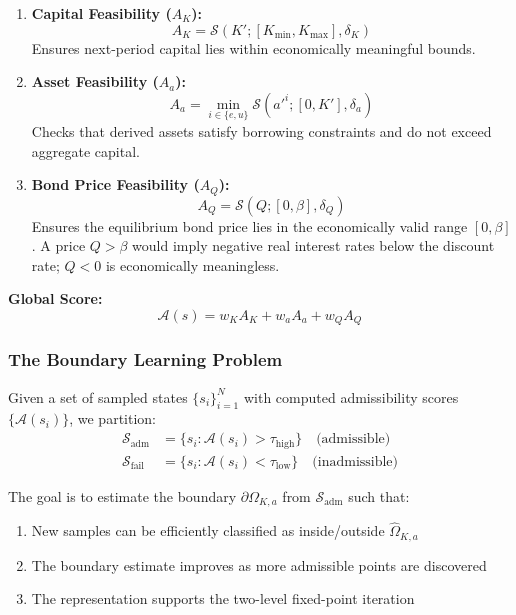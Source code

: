 \begin{enumerate}
    \item \textbf{Capital Feasibility ($A_K$):}
    \begin{equation}
        A_K = \mathcal{S}(K'; [K_{\min}, K_{\max}], \delta_K)
    \end{equation}
    Ensures next-period capital lies within economically meaningful bounds.
    
    \item \textbf{Asset Feasibility ($A_a$):}
    \begin{equation}
        A_a = \min_{i \in \{e, u\}} \mathcal{S}(a'^i; [0, K'], \delta_a)
    \end{equation}
    Checks that derived assets satisfy borrowing constraints and do not exceed aggregate capital.
    
    \item \textbf{Bond Price Feasibility ($A_Q$):}
    \begin{equation}
        A_Q = \mathcal{S}(Q; [0, \beta], \delta_Q)
    \end{equation}
    Ensures the equilibrium bond price lies in the economically valid range $[0, \beta]$. A price $Q > \beta$ would imply negative real interest rates below the discount rate; $Q < 0$ is economically meaningless.
\end{enumerate}

\textbf{Global Score:}
\begin{equation}
    \mathcal{A}(s) = w_K A_K + w_a A_a + w_Q A_Q
\end{equation}

\subsubsection{The Boundary Learning Problem}

Given a set of sampled states $\{s_i\}_{i=1}^N$ with computed admissibility scores $\{\mathcal{A}(s_i)\}$, we partition:
\begin{align}
    \mathcal{S}_{\text{adm}} &= \{s_i : \mathcal{A}(s_i) > \tau_{\text{high}}\} \quad \text{(admissible)} \\
    \mathcal{S}_{\text{fail}} &= \{s_i : \mathcal{A}(s_i) < \tau_{\text{low}}\} \quad \text{(inadmissible)}
\end{align}

The goal is to estimate the boundary $\partial \Omega_{K,a}$ from $\mathcal{S}_{\text{adm}}$ such that:
\begin{enumerate}
    \item New samples can be efficiently classified as inside/outside $\hat{\Omega}_{K,a}$
    \item The boundary estimate improves as more admissible points are discovered
    \item The representation supports the two-level fixed-point iteration
\end{enumerate}

